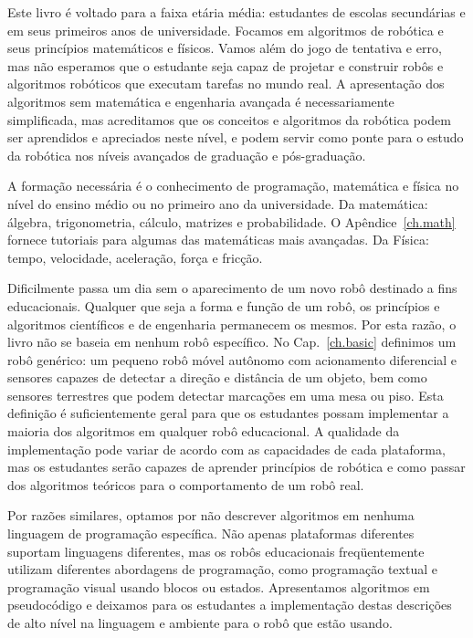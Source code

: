Este livro é voltado para a faixa etária média: estudantes de escolas secundárias e em seus primeiros anos de universidade. Focamos em algoritmos de robótica e seus princípios matemáticos e físicos. Vamos além do jogo de tentativa e erro, mas não esperamos que o estudante seja capaz de projetar e construir robôs e algoritmos robóticos que executam tarefas no mundo real. A apresentação dos algoritmos sem matemática e engenharia avançada é necessariamente simplificada, mas acreditamos que os conceitos e algoritmos da robótica podem ser aprendidos e apreciados neste nível, e podem servir como ponte para o estudo da robótica nos níveis avançados de graduação e pós-graduação.

A formação necessária é o conhecimento de programação, matemática e física no nível do ensino médio ou no primeiro ano da universidade. Da matemática: álgebra, trigonometria, cálculo, matrizes e probabilidade. O Apêndice~\ref{ch.math} fornece tutoriais para algumas das matemáticas mais avançadas. Da Física: tempo, velocidade, aceleração, força e fricção.

Dificilmente passa um dia sem o aparecimento de um novo robô destinado a fins educacionais. Qualquer que seja a forma e função de um robô, os princípios e algoritmos científicos e de engenharia permanecem os mesmos. Por esta razão, o livro não se baseia em nenhum robô específico. No Cap.~\ref{ch.basic} definimos um robô genérico: um pequeno robô móvel autônomo com acionamento diferencial e sensores capazes de detectar a direção e distância de um objeto, bem como sensores terrestres que podem detectar marcações em uma mesa ou piso. Esta definição é suficientemente geral para que os estudantes possam implementar a maioria dos algoritmos em qualquer robô educacional. A qualidade da implementação pode variar de acordo com as capacidades de cada plataforma, mas os estudantes serão capazes de aprender princípios de robótica e como passar dos algoritmos teóricos para o comportamento de um robô real.

Por razões similares, optamos por não descrever algoritmos em nenhuma linguagem de programação específica. Não apenas plataformas diferentes suportam linguagens diferentes, mas os robôs educacionais freqüentemente utilizam diferentes abordagens de programação, como programação textual e programação visual usando blocos ou estados. Apresentamos algoritmos em pseudocódigo e deixamos para os estudantes a implementação destas descrições de alto nível na linguagem e ambiente para o robô que estão usando.

